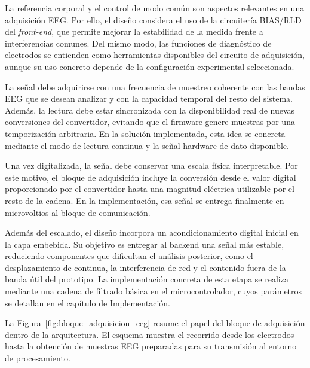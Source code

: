 \documentclass[../main.tex]{subfiles}
\begin{document}
La referencia corporal y el control de modo común son aspectos relevantes en una adquisición EEG. Por ello, el diseño considera el uso de la circuitería BIAS/RLD del \textit{front-end}, que permite mejorar la estabilidad de la medida frente a interferencias comunes. Del mismo modo, las funciones de diagnóstico de electrodos se entienden como herramientas disponibles del circuito de adquisición, aunque su uso concreto depende de la configuración experimental seleccionada.

La señal debe adquirirse con una frecuencia de muestreo coherente con las bandas EEG que se desean analizar y con la capacidad temporal del resto del sistema. Además, la lectura debe estar sincronizada con la disponibilidad real de nuevas conversiones del convertidor, evitando que el firmware genere muestras por una temporización arbitraria. En la solución implementada, esta idea se concreta mediante el modo de lectura continua y la señal hardware de dato disponible.

Una vez digitalizada, la señal debe conservar una escala física interpretable. Por este motivo, el bloque de adquisición incluye la conversión desde el valor digital proporcionado por el convertidor hasta una magnitud eléctrica utilizable por el resto de la cadena. En la implementación, esa señal se entrega finalmente en microvoltios al bloque de comunicación.

Además del escalado, el diseño incorpora un acondicionamiento digital inicial en la capa embebida. Su objetivo es entregar al backend una señal más estable, reduciendo componentes que dificultan el análisis posterior, como el desplazamiento de continua, la interferencia de red y el contenido fuera de la banda útil del prototipo. La implementación concreta de esta etapa se realiza mediante una cadena de filtrado básica en el microcontrolador, cuyos parámetros se detallan en el capítulo de Implementación.

La Figura~\ref{fig:bloque_adquisicion_eeg} resume el papel del bloque de adquisición dentro de la arquitectura. El esquema muestra el recorrido desde los electrodos hasta la obtención de muestras EEG preparadas para su transmisión al entorno de procesamiento.
\end{document}
